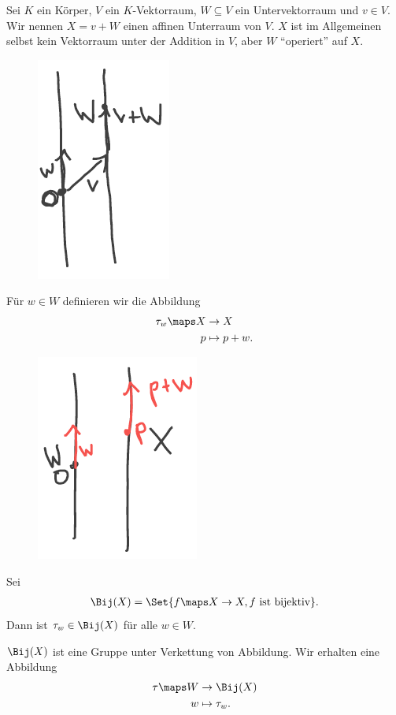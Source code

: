 \begin{beispiel}\label{affiner_unterraum}
    Sei \( K \) ein Körper, \( V \) ein \( K \)-Vektorraum, \( W\subseteq V \) ein Untervektorraum und \( v\in V \). 
    Wir nennen \( X=v+W \) einen affinen Unterraum von \( V \). 
    \( X \) ist im Allgemeinen selbst kein Vektorraum unter der Addition in \( V \), aber \( W \) \enquote{operiert} auf \( X \).
    \begin{figure}[H]
        \centering
        \includegraphics[width=0.2\linewidth]{figures/affiner_unterraum}
        \label{fig:affiner_unterraum}
    \end{figure}
    
    Für \( w\in W \) definieren wir die Abbildung
    \begin{align*}
        \tau_w\maps \begin{aligned}[t] 
            X&\to X\\
            p &\mapsto p+w.
        \end{aligned}
    \end{align*}
    \begin{figure}[H]
        \centering
        \includegraphics[width=0.2\linewidth]{figures/tau_w}
        \label{fig:tau_w}
    \end{figure}
    Sei
    \begin{align*}
        \Bij(X)=\Set{f\maps X\to X, f \text{ ist bijektiv}}.
    \end{align*}
    Dann ist \( \tau_w\in \Bij(X) \) für alle \( w\in W \).
\end{beispiel}
\begin{bemerkung*}
    \( \Bij(X) \) ist eine Gruppe unter Verkettung von Abbildung. 
    Wir erhalten eine Abbildung
    \begin{align*}
        \tau\maps \begin{aligned}[t] 
            W &\to \Bij(X)\\
            w &\mapsto \tau_w.
        \end{aligned}
    \end{align*}
\end{bemerkung*}
